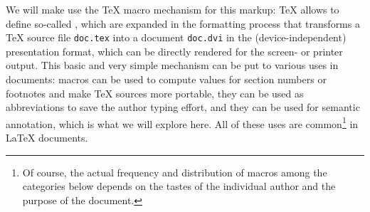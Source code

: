 We will make use the {\TeX} macro mechanism for this markup: {\TeX} allows to
define so-called {}, which are expanded in the formatting process
that transforms a {\TeX} source file {\tt{doc.tex}} into a document {\tt{doc.dvi}}
in the (device-independent) presentation format, which can be directly rendered
for the screen- or printer output. This basic and very simple mechanism can be put
to various uses in documents: macros can be used to compute values for section
numbers or footnotes and make {\TeX} sources more portable, they can be used as
abbreviations to save the author typing effort, and they can be used for semantic
annotation, which is what we will explore here. All of these uses are
common\footnote{Of course, the actual frequency and distribution of macros among
  the categories below depends on the tastes of the individual author and the
  purpose of the document.} in {\LaTeX} documents.
